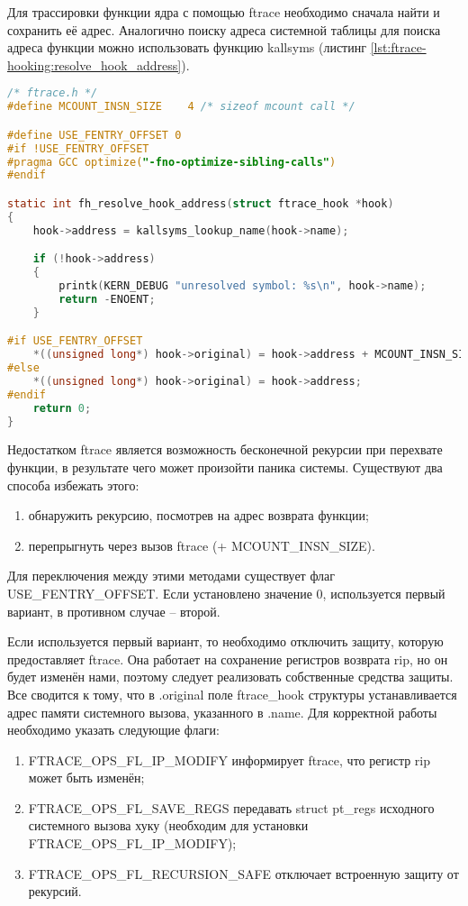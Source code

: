         Для трассировки функции ядра с помощью ftrace
        необходимо сначала найти и сохранить её адрес.
        Аналогично поиску адреса системной таблицы
        для поиска адреса функции можно использовать функцию kallsyms (листинг \ref{lst:ftrace-hooking:resolve_hook_address}).

    \begin{lstlisting}[language=C, label=lst:ftrace-hooking:resolve_hook_address, caption=Поиск адреса функции по символьному имени]
/* ftrace.h */
#define MCOUNT_INSN_SIZE	4 /* sizeof mcount call */

#define USE_FENTRY_OFFSET 0
#if !USE_FENTRY_OFFSET
#pragma GCC optimize("-fno-optimize-sibling-calls")
#endif

static int fh_resolve_hook_address(struct ftrace_hook *hook)
{
    hook->address = kallsyms_lookup_name(hook->name);

    if (!hook->address)
    {
        printk(KERN_DEBUG "unresolved symbol: %s\n", hook->name);
        return -ENOENT;
    }

#if USE_FENTRY_OFFSET
    *((unsigned long*) hook->original) = hook->address + MCOUNT_INSN_SIZE;
#else
    *((unsigned long*) hook->original) = hook->address;
#endif
    return 0;
}
    \end{lstlisting}

    Недостатком ftrace является возможность бесконечной рекурсии при перехвате функции,
    в результате чего может произойти паника системы.
    Существуют два способа избежать этого:
    \begin{enumerate}
        \item обнаружить рекурсию, посмотрев на адрес возврата функции;
        \item перепрыгнуть через вызов ftrace (+ MCOUNT\_INSN\_SIZE).
    \end{enumerate}
    Для переключения между этими методами существует флаг USE\_FENTRY\_OFFSET.
    Если установлено значение 0, используется первый вариант, в противном случае -- второй.

    Если используется первый вариант, то необходимо отключить защиту, которую предоставляет ftrace.
    Она работает на сохранение регистров возврата rip, но он будет изменён нами,
    поэтому следует реализовать собственные средства защиты.
    Все сводится к тому, что в .original поле ftrace\_hook структуры 
    устанавливается адрес памяти системного вызова, указанного в .name.
    Для корректной работы необходимо указать следующие флаги:
    \begin{enumerate}
        \item FTRACE\_OPS\_FL\_IP\_MODIFY информирует ftrace, что регистр rip может быть изменён;
        \item FTRACE\_OPS\_FL\_SAVE\_REGS передавать struct pt\_regs исходного системного вызова хуку 
            (необходим для установки FTRACE\_OPS\_FL\_IP\_MODIFY);
        \item FTRACE\_OPS\_FL\_RECURSION\_SAFE отключает встроенную защиту от рекурсий.
    \end{enumerate}

